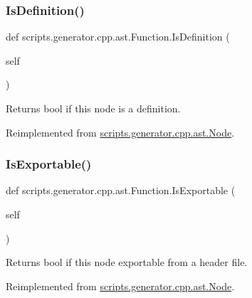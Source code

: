 \subsubsection{\texorpdfstring{IsDefinition()}{IsDefinition()}}
{\footnotesize\ttfamily def scripts.\+generator.\+cpp.\+ast.\+Function.\+Is\+Definition (\begin{DoxyParamCaption}\item[{}]{self }\end{DoxyParamCaption})}

\begin{DoxyVerb}Returns bool if this node is a definition.\end{DoxyVerb}
 

Reimplemented from \mbox{\hyperlink{classscripts_1_1generator_1_1cpp_1_1ast_1_1_node_a53663c2acef5d6954d065e11d2fd53a1}{scripts.\+generator.\+cpp.\+ast.\+Node}}.

\mbox{\label{classscripts_1_1generator_1_1cpp_1_1ast_1_1_function_a1920a361baf96f213a642d0a1a9a43c8}} 
\subsubsection{\texorpdfstring{IsExportable()}{IsExportable()}}
{\footnotesize\ttfamily def scripts.\+generator.\+cpp.\+ast.\+Function.\+Is\+Exportable (\begin{DoxyParamCaption}\item[{}]{self }\end{DoxyParamCaption})}

\begin{DoxyVerb}Returns bool if this node exportable from a header file.\end{DoxyVerb}
 

Reimplemented from \mbox{\hyperlink{classscripts_1_1generator_1_1cpp_1_1ast_1_1_node_a298c446d34e08a78b5ebb477eb55863b}{scripts.\+generator.\+cpp.\+ast.\+Node}}.

\mbox{\label{classscripts_1_1generator_1_1cpp_1_1ast_1_1_function_ad98d013eccda376cfda87f43c37233b5}} 
